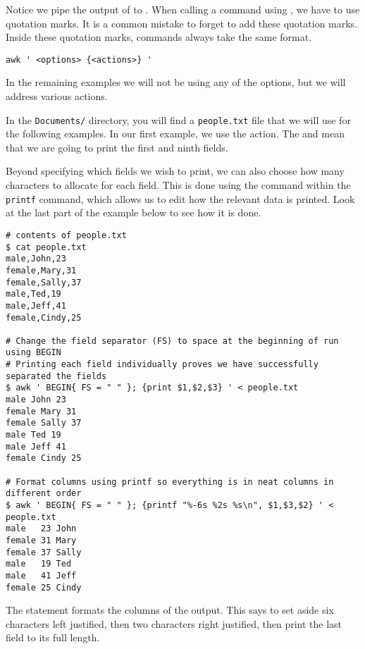 Notice we pipe the output of  to .
When calling a command using , we have to use quotation marks.
It is a common mistake to forget to add these quotation marks.
Inside these quotation marks, commands always take the same format.

\begin{lstlisting}
awk ' <options> {<actions>} '
\end{lstlisting}

In the remaining examples we will not be using any of the options, but we will address various actions.

In the \texttt{Documents/} directory, you will find a \texttt{people.txt} file that we will use for the following examples.
In our first example, we use the  action.
The  and  mean that we are going to print the first and ninth fields.

Beyond specifying which fields we wish to print, we can also choose how many characters to allocate for each field.
This is done using the \li{\%} command within the \texttt{printf} command, which allows us to edit how the relevant data is printed.
Look at the last part of the example below to see how it is done.

\begin{lstlisting}
# contents of people.txt
$ cat people.txt
male,John,23
female,Mary,31
female,Sally,37
male,Ted,19
male,Jeff,41
female,Cindy,25

# Change the field separator (FS) to space at the beginning of run using BEGIN 
# Printing each field individually proves we have successfully separated the fields
$ awk ' BEGIN{ FS = " " }; {print $1,$2,$3} ' < people.txt
male John 23
female Mary 31
female Sally 37
male Ted 19
male Jeff 41
female Cindy 25

# Format columns using printf so everything is in neat columns in different order
$ awk ' BEGIN{ FS = " " }; {printf "%-6s %2s %s\n", $1,$3,$2} ' < people.txt
male   23 John
female 31 Mary
female 37 Sally
male   19 Ted
male   41 Jeff
female 25 Cindy
\end{lstlisting}

The statement  formats the columns of the output.
This says to set aside six characters left justified, then two characters right justified, then print the last field to its full length.

